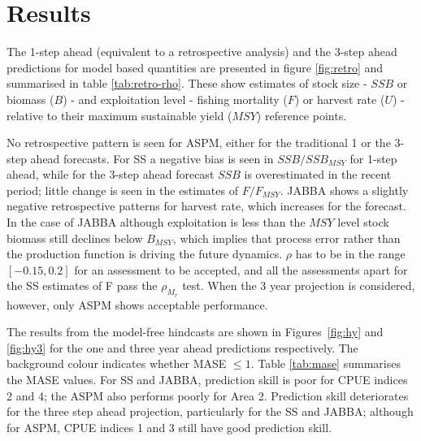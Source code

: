 \documentclass[12pt,halfline,a4paper,nonumbib]{ouparticle}
\begin{document}



\section{Results}

The 1-step ahead (equivalent to a retrospective analysis) and the 3-step ahead predictions for model based quantities are presented in figure \ref{fig:retro} and summarised in table \ref{tab:retro-rho}. These show estimates of stock size - $SSB$ or biomass ($B$) - and exploitation level - fishing mortality ($F$) or harvest rate ($U$) - relative to their maximum sustainable yield ($MSY$) reference points.

No retrospective pattern is seen for ASPM, either for the traditional 1 or the 3-step ahead forecasts. For SS a negative bias is seen in $SSB/SSB_{MSY}$ for 1-step ahead, while for the 3-step ahead forecast $SSB$ is overestimated in the recent period; little change is seen in the estimates of $F/F_{MSY}$. JABBA shows a slightly negative retrospective patterns for harvest rate, which increases for the forecast. In the case of JABBA although exploitation is less than the ${MSY}$ level stock biomass still declines below $B_{MSY}$, which implies that process error rather than the production function is driving the future dynamics. $\rho$ has to be in the range $[-0.15,0.2]$ for an assessment to be accepted, and all the assessments apart for the SS estimates of F pass the $\rho_{M_r}$ test. When the 3 year projection is considered, however, only ASPM shows acceptable performance. 

The results from the model-free hindcasts are shown in Figures~\ref{fig:hy} and \ref{fig:hy3} for the one and three year ahead predictions respectively. The background colour indicates whether MASE $\le 1$. Table \ref{tab:mase} summarises the MASE values. For SS and JABBA, prediction skill is poor for CPUE indices 2 and 4; the ASPM also performs poorly for Area 2. Prediction skill deteriorates for the three step ahead projection, particularly for the SS and JABBA; although for ASPM, CPUE indices 1 and 3 still have good prediction skill. 
\end{document}
